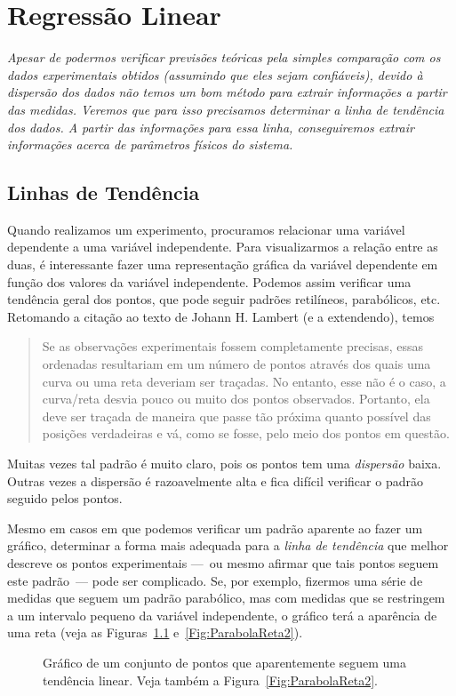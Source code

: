 \chapter{Regressão Linear}
\label{Chap:RegressoLinear}

\begin{fullwidth}
{\it
Apesar de podermos verificar previsões teóricas pela simples comparação com os dados experimentais obtidos (assumindo que eles sejam confiáveis), devido à dispersão dos dados não temos um bom método para extrair informações a partir das medidas. Veremos que para isso precisamos determinar a linha de tendência dos dados. A partir das informações para essa linha, conseguiremos extrair informações acerca de parâmetros físicos do sistema.
}
\end{fullwidth}

\section{Linhas de Tendência}

Quando realizamos um experimento, procuramos relacionar uma variável dependente a uma variável independente. Para visualizarmos a relação entre as duas, é interessante fazer uma representação gráfica da variável dependente em função dos valores da variável independente. Podemos assim verificar uma tendência geral dos pontos, que pode seguir padrões retilíneos, parabólicos, etc. Retomando a citação ao texto de Johann H. Lambert (e a extendendo), temos\cite{Lambert}
\begin{quote}
Se as observações experimentais fossem completamente precisas, essas ordenadas resultariam em um número de pontos através dos quais uma curva ou uma reta deveriam ser traçadas. No entanto, esse não é o caso, a curva/reta desvia pouco ou muito dos pontos observados. Portanto, ela deve ser traçada de maneira que passe tão próxima quanto possível das posições verdadeiras e vá, como se fosse, pelo meio dos pontos em questão.
\end{quote}
%
Muitas vezes tal padrão é muito claro, pois os pontos tem uma \emph{dispersão} baixa. Outras vezes a dispersão é razoavelmente alta e fica difícil verificar o padrão seguido pelos pontos.

Mesmo em casos em que podemos verificar um padrão aparente ao fazer um gráfico, determinar a forma mais adequada para a \emph{linha de tendência} que melhor descreve os pontos experimentais ---~ou mesmo afirmar que tais pontos seguem este padrão~--- pode ser complicado. Se, por exemplo, fizermos uma série de medidas que seguem um padrão parabólico, mas com medidas que se restringem a um intervalo pequeno da variável independente, o gráfico terá a aparência de uma reta (veja as Figuras~\ref{Fig:ParabolaReta} e~\ref{Fig:ParabolaReta2}).
\begin{figure}
\centering
\forceversofloat
\caption{Gráfico de um conjunto de pontos que aparentemente seguem uma tendência linear. Veja também a Figura~\ref{Fig:ParabolaReta2}.}
\label{Fig:ParabolaReta}

\end{figure}

